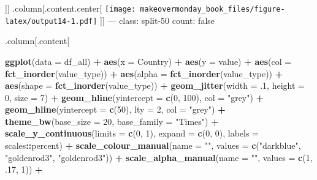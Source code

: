 \documentclass[]{book}
\newenvironment{Shaded}{\begin{snugshade}}{\end{snugshade}}
\newcommand{\KeywordTok}[1]{\textcolor[rgb]{0.13,0.29,0.53}{\textbf{#1}}}
\newcommand{\DataTypeTok}[1]{\textcolor[rgb]{0.13,0.29,0.53}{#1}}
\newcommand{\DecValTok}[1]{\textcolor[rgb]{0.00,0.00,0.81}{#1}}
\newcommand{\StringTok}[1]{\textcolor[rgb]{0.31,0.60,0.02}{#1}}
\newcommand{\OperatorTok}[1]{\textcolor[rgb]{0.81,0.36,0.00}{\textbf{#1}}}
\newcommand{\NormalTok}[1]{#1}
\theoremstyle{definition}
\theoremstyle{definition}
\theoremstyle{definition}
\theoremstyle{remark}
\begin{document}
{]}{]} .column{[}.content.center{[}
\texttt{[image: makeovermonday\_book\_files/figure-latex/output14-1.pdf]}
{]}{]} --- class: split-50 count: false

.column{[}.content{[}

\begin{Shaded}
\begin{Highlighting}[]
\KeywordTok{ggplot}\NormalTok{(}\DataTypeTok{data =}\NormalTok{ df_all) }\OperatorTok{+}
\StringTok{  }\KeywordTok{aes}\NormalTok{(}\DataTypeTok{x =}\NormalTok{ Country) }\OperatorTok{+}
\StringTok{  }\KeywordTok{aes}\NormalTok{(}\DataTypeTok{y =}\NormalTok{ value) }\OperatorTok{+}
\StringTok{  }\KeywordTok{aes}\NormalTok{(}\DataTypeTok{col =} \KeywordTok{fct_inorder}\NormalTok{(value_type)) }\OperatorTok{+}
\StringTok{  }\KeywordTok{aes}\NormalTok{(}\DataTypeTok{alpha =} \KeywordTok{fct_inorder}\NormalTok{(value_type)) }\OperatorTok{+}
\StringTok{  }\KeywordTok{aes}\NormalTok{(}\DataTypeTok{shape =} \KeywordTok{fct_inorder}\NormalTok{(value_type)) }\OperatorTok{+}
\StringTok{  }\KeywordTok{geom_jitter}\NormalTok{(}\DataTypeTok{width =}\NormalTok{ .}\DecValTok{1}\NormalTok{, }\DataTypeTok{height =} \DecValTok{0}\NormalTok{, }\DataTypeTok{size =} \DecValTok{7}\NormalTok{) }\OperatorTok{+}
\StringTok{  }\KeywordTok{geom_hline}\NormalTok{(}\DataTypeTok{yintercept =} \KeywordTok{c}\NormalTok{(}\DecValTok{0}\NormalTok{, }\DecValTok{100}\NormalTok{), }\DataTypeTok{col =} \StringTok{"grey"}\NormalTok{) }\OperatorTok{+}
\StringTok{  }\KeywordTok{geom_hline}\NormalTok{(}\DataTypeTok{yintercept =} \KeywordTok{c}\NormalTok{(}\DecValTok{50}\NormalTok{), }\DataTypeTok{lty =} \DecValTok{2}\NormalTok{, }\DataTypeTok{col =} \StringTok{"grey"}\NormalTok{) }\OperatorTok{+}
\StringTok{  }\KeywordTok{theme_bw}\NormalTok{(}\DataTypeTok{base_size =} \DecValTok{20}\NormalTok{, }\DataTypeTok{base_family =} \StringTok{"Times"}\NormalTok{) }\OperatorTok{+}
\StringTok{  }\KeywordTok{scale_y_continuous}\NormalTok{(}\DataTypeTok{limits =} \KeywordTok{c}\NormalTok{(}\DecValTok{0}\NormalTok{, }\DecValTok{1}\NormalTok{), }\DataTypeTok{expand =} \KeywordTok{c}\NormalTok{(}\DecValTok{0}\NormalTok{, }\DecValTok{0}\NormalTok{), }\DataTypeTok{labels =}\NormalTok{ scales}\OperatorTok{::}\NormalTok{percent) }\OperatorTok{+}
\StringTok{  }\KeywordTok{scale_colour_manual}\NormalTok{(}\DataTypeTok{name =} \StringTok{""}\NormalTok{, }\DataTypeTok{values =} \KeywordTok{c}\NormalTok{(}\StringTok{"darkblue"}\NormalTok{, }\StringTok{"goldenrod3"}\NormalTok{, }\StringTok{"goldenrod3"}\NormalTok{)) }\OperatorTok{+}
\StringTok{  }\KeywordTok{scale_alpha_manual}\NormalTok{(}\DataTypeTok{name =} \StringTok{""}\NormalTok{, }\DataTypeTok{values =} \KeywordTok{c}\NormalTok{(}\DecValTok{1}\NormalTok{, .}\DecValTok{17}\NormalTok{, }\DecValTok{1}\NormalTok{)) }\OperatorTok{+}

\end{Highlighting}
\end{Shaded}
\end{document}
